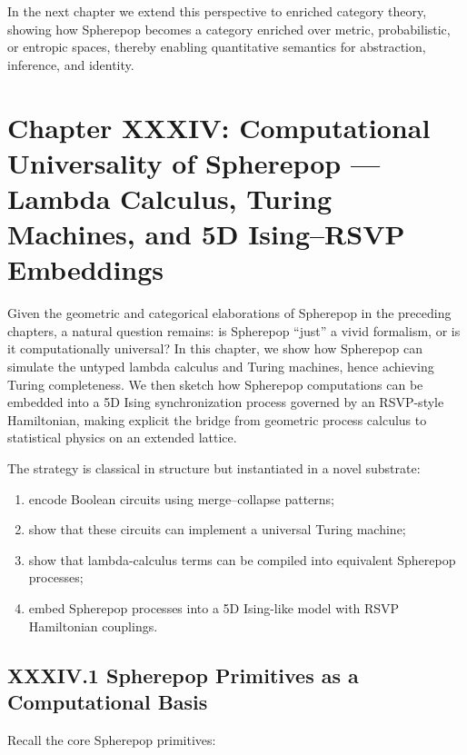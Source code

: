 \documentclass[12pt,letterpaper]{article}
\begin{document}
In the next chapter we extend this perspective to enriched category theory, showing how Spherepop becomes a category enriched over metric, probabilistic, or entropic spaces, thereby enabling quantitative semantics for abstraction, inference, and identity.
\newpage

\section{Chapter XXXIV: Computational Universality of Spherepop —  
Lambda Calculus, Turing Machines, and 5D Ising--RSVP Embeddings}

Given the geometric and categorical elaborations of Spherepop in the preceding chapters, a natural question remains: is Spherepop ``just'' a vivid formalism, or is it computationally universal? In this chapter, we show how Spherepop can simulate the untyped lambda calculus and Turing machines, hence achieving Turing completeness. We then sketch how Spherepop computations can be embedded into a 5D Ising synchronization process governed by an RSVP-style Hamiltonian, making explicit the bridge from geometric process calculus to statistical physics on an extended lattice.

The strategy is classical in structure but instantiated in a novel substrate:

\begin{enumerate}
  \item encode Boolean circuits using merge--collapse patterns;
  \item show that these circuits can implement a universal Turing machine;
  \item show that lambda-calculus terms can be compiled into equivalent Spherepop processes;
  \item embed Spherepop processes into a 5D Ising-like model with RSVP Hamiltonian couplings.
\end{enumerate}

\subsection{XXXIV.1 Spherepop Primitives as a Computational Basis}

Recall the core Spherepop primitives:
\end{document}
